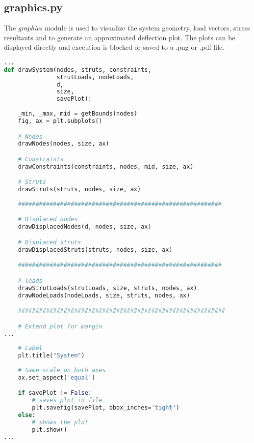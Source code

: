 \pagebreak

\subsection{graphics.py}
\label{subsec:graphics.py}

The \textit{graphics} module is used to visualize the system geometry, load vectors, stress resultants and to generate an approximated deflection plot.
The plots can be displayed directly and execution is blocked or saved to a .png or .pdf file.

\begin{inconsolata}
\begin{minipage}{\linewidth}
\begin{lstlisting}[language=python]
...
def drawSystem(nodes, struts, constraints,
               strutLoads, nodeLoads,
               d,
               size,
               savePlot):
    
    _min, _max, mid = getBounds(nodes)
    fig, ax = plt.subplots() 

    # Nodes
    drawNodes(nodes, size, ax)

    # Constraints
    drawConstraints(constraints, nodes, mid, size, ax)

    # Struts
    drawStruts(struts, nodes, size, ax)
    
    ##########################################################

    # Displaced nodes
    drawDisplacedNodes(d, nodes, size, ax)

    # Displaced struts
    drawDisplacedStruts(struts, nodes, size, ax)

    ##########################################################

    # loads
    drawStrutLoads(strutLoads, size, struts, nodes, ax)
    drawNodeLoads(nodeLoads, size, struts, nodes, ax)

    ###########################################################

    # Extend plot for margin
...
    
    # Label
    plt.title("System")
    
    # Same scale on both axes
    ax.set_aspect('equal')

    if savePlot != False:
        # saves plot in file
        plt.savefig(savePlot, bbox_inches='tight')
    else:
        # shows the plot
        plt.show()
...
\end{lstlisting}
\end{minipage}
\end{inconsolata}

\pagebreak

